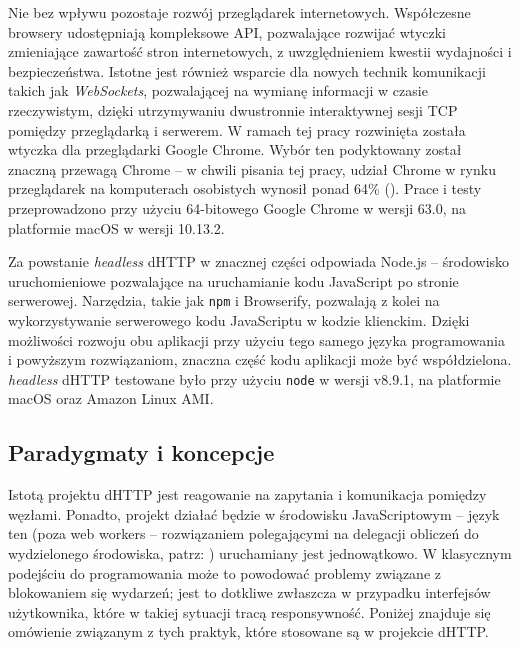 Nie bez wpływu pozostaje rozwój przeglądarek internetowych. Współczesne browsery udostępniają kompleksowe API, pozwalające rozwijać wtyczki zmieniające zawartość stron internetowych, z uwzględnieniem kwestii wydajności i bezpieczeństwa. Istotne jest również wsparcie dla nowych technik komunikacji takich jak {\em WebSockets}, pozwalającej na wymianę informacji w czasie rzeczywistym, dzięki utrzymywaniu dwustronnie interaktywnej sesji TCP pomiędzy przeglądarką i serwerem. W ramach tej pracy rozwinięta została wtyczka dla przeglądarki Google Chrome. Wybór ten podyktowany został znaczną przewagą Chrome -- w chwili pisania tej pracy, udział Chrome w rynku przeglądarek na komputerach osobistych wynosił ponad 64\% (\cite{chromeStats}). Prace i testy przeprowadzono przy użyciu 64-bitowego Google Chrome w wersji 63.0, na platformie macOS w wersji 10.13.2.

Za powstanie {\em headless} dHTTP w znacznej części odpowiada Node.js -- środowisko uruchomieniowe pozwalające na uruchamianie kodu JavaScript po stronie serwerowej.  Narzędzia, takie jak \texttt{npm} i Browserify, pozwalają z kolei na wykorzystywanie serwerowego kodu JavaScriptu w kodzie klienckim. Dzięki możliwości rozwoju obu aplikacji przy użyciu tego samego języka programowania i powyższym rozwiązaniom, znaczna część  kodu aplikacji może być współdzielona. {\em headless} dHTTP testowane było przy użyciu \texttt{node} w wersji v8.9.1, na platformie macOS oraz Amazon Linux AMI.


\subsection{Paradygmaty i koncepcje}
Istotą projektu dHTTP jest reagowanie na zapytania i komunikacja pomiędzy węzłami. Ponadto, projekt działać będzie w środowisku JavaScriptowym -- język ten (poza web workers -- rozwiązaniem polegającymi na delegacji obliczeń do wydzielonego środowiska, patrz: \cite{webWorkers}) uruchamiany jest jednowątkowo. W klasycznym podejściu do programowania może to powodować problemy związane z blokowaniem się wydarzeń; jest to dotkliwe zwłaszcza w przypadku interfejsów użytkownika, które w takiej sytuacji tracą responsywność. Poniżej znajduje się omówienie związanym z tych praktyk, które stosowane są w projekcie dHTTP.

